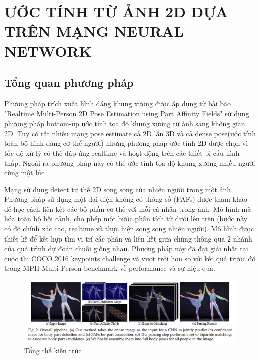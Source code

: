 \section{ƯỚC TÍNH TỪ ẢNH 2D DỰA TRÊN MẠNG NEURAL NETWORK}
\label{ss:2Dpose}
\subsection{Tổng quan phương pháp}
\label{sss:tong_quan_2D_pose}
Phương pháp trích xuất hình dáng khung xương được áp dụng từ bài báo "Realtime Multi-Person 2D Pose Estimation using Part Affinity Fields" \cite{cao2017realtime} sử dụng phương pháp bottom-up ước tính tọa độ khung xương từ ảnh sang không gian 2D. Tuy có rất nhiều mạng pose estimate cả 2D lẫn 3D và cả dense pose(ước tính toàn bộ hình dáng cơ thể người) nhưng phương pháp ước tính 2D được chọn vì tốc độ xử lý có thể đáp ứng realtime và hoạt động trên các thiết bị cấu hình thấp. Ngoài ra phương pháp này có thể ước tính tọa độ khung xương nhiều người cùng một lúc 

Mạng sử dụng  detect tư thế 2D song song của nhiều người trong một ảnh. Phương pháp sử dụng một đại diện không có thông số (PAFs) được tham khảo để học cách liên kết các bộ phần cơ thể với mỗi cá nhân trong ảnh. Mô hình mã hóa toàn bộ bối cảnh, cho phép một bước phân tích từ dưới lên trên (bước này có độ chính xác cao, realtime và thực hiện song song nhiều người). Mô hình được thiết kế để kết hợp tìm vị trí các phần và liên kết giữa chúng thông qua 2 nhánh của quá trình dự đoán chuỗi giống nhau. Phương pháp này đã đạt giải nhất tại cuộc thi COCO 2016 keypoints challenge và vượt trội hơn so với kết quả trước đó trong MPII Multi-Person benchmark về performance và sự hiệu quả.


\FloatBarrier
\begin{figure}[htp]
\begin{center}
\includegraphics[scale=0.3]{chap3/c3_figs/pipeline.png}
\end{center}
\caption{Tổng thể kiến trúc}
\label{fig:pipeline}
\end{figure}
\FloatBarrier

